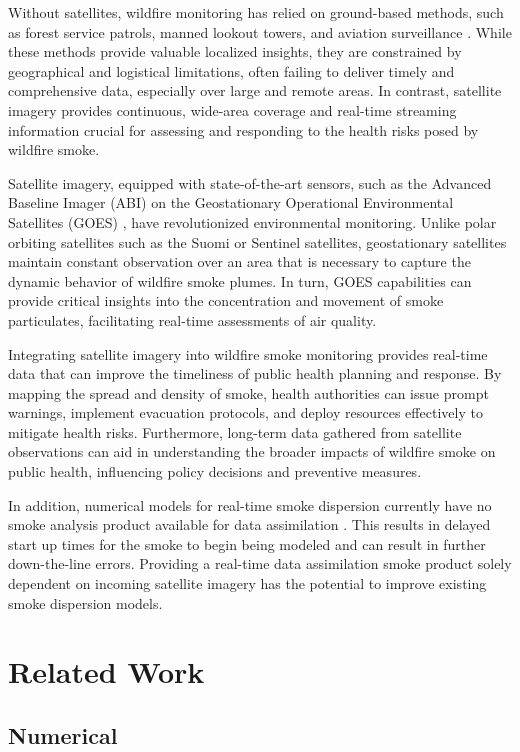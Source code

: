 \documentclass{article}
\begin{document}
Without satellites, wildfire monitoring has relied on ground-based methods, such as forest service patrols, manned lookout towers, and aviation surveillance \cite{smoke_monitoring}. While these methods provide valuable localized insights, they are constrained by geographical and logistical limitations, often failing to deliver timely and comprehensive data, especially over large and remote areas. In contrast, satellite imagery provides continuous, wide-area coverage and real-time streaming information crucial for assessing and responding to the health risks posed by wildfire smoke.

Satellite imagery, equipped with state-of-the-art sensors, such as the Advanced Baseline Imager (ABI) on the Geostationary Operational Environmental Satellites (GOES) \cite{goes}, have revolutionized environmental monitoring. Unlike polar orbiting satellites such as the Suomi or Sentinel satellites, geostationary satellites maintain constant observation over an area that is necessary to capture the dynamic behavior of wildfire smoke plumes. In turn, GOES capabilities can provide critical insights into the concentration and movement of smoke particulates, facilitating real-time assessments of air quality.

Integrating satellite imagery into wildfire smoke monitoring provides real-time data that can improve the timeliness of public health planning and response. By mapping the spread and density of smoke, health authorities can issue prompt warnings, implement evacuation protocols, and deploy resources effectively to mitigate health risks. Furthermore, long-term data gathered from satellite observations can aid in understanding the broader impacts of wildfire smoke on public health, influencing policy decisions and preventive measures.

In addition, numerical models for real-time smoke dispersion currently have no smoke analysis product available for data assimilation \cite{hrrr, rrfs}. This results in delayed start up times for the smoke to begin being modeled and can result in further down-the-line errors. Providing a real-time data assimilation smoke product solely dependent on incoming satellite imagery has the potential to improve existing smoke dispersion models.

\section{Related Work}

\subsection{Numerical}
\end{document}
